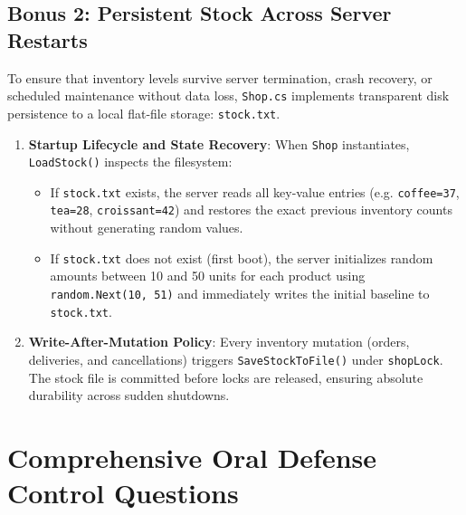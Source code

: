 \documentclass[11pt,a4paper]{article}
\begin{document}
\subsection{Bonus 2: Persistent Stock Across Server Restarts}
To ensure that inventory levels survive server termination, crash recovery, or scheduled maintenance without data loss, \texttt{Shop.cs} implements transparent disk persistence to a local flat-file storage: \texttt{stock.txt}.

\begin{enumerate}
    \item \textbf{Startup Lifecycle and State Recovery}:
    When \texttt{Shop} instantiates, \texttt{LoadStock()} inspects the filesystem:
    \begin{itemize}
        \item If \texttt{stock.txt} exists, the server reads all key-value entries (e.g. \texttt{coffee=37}, \texttt{tea=28}, \texttt{croissant=42}) and restores the exact previous inventory counts without generating random values.
        \item If \texttt{stock.txt} does not exist (first boot), the server initializes random amounts between 10 and 50 units for each product using \texttt{random.Next(10, 51)} and immediately writes the initial baseline to \texttt{stock.txt}.
    \end{itemize}
    \item \textbf{Write-After-Mutation Policy}:
    Every inventory mutation (orders, deliveries, and cancellations) triggers \texttt{SaveStockToFile()} under \texttt{shopLock}. The stock file is committed before locks are released, ensuring absolute durability across sudden shutdowns.
\end{enumerate}

\section{Comprehensive Oral Defense Control Questions}
\end{document}
